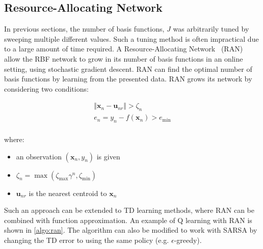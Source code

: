 \documentclass{article}
\begin{document}
\subsection{Resource-Allocating Network}

In previous sections, the number of basis functions, $J$ was arbitrarily tuned by sweeping multiple different values. Such a tuning method is often impractical due to a large amount of time required. A Resource-Allocating Network~\cite{plattResourceallocatingNetworkFunction1991} (RAN) allow the RBF network to grow in its number of basis functions in an online setting, using stochastic gradient descent. RAN can find the optimal number of basis functions by learning from the presented data. RAN grows its network by considering two conditions:

\begin{equation}
    \begin{split}
        \Vert \pmb{x}_n - \pmb{u}_{nr} \Vert > \zeta_n\\
        e_n = y_n - f(\pmb{x}_n) > e_{\min}\\
    \end{split}
\end{equation}

where:
\begin{itemize}
    \item an observation $(\pmb{x}_n, y_n)$ is given
    \item $\zeta_n = \max(\zeta_{\max} \gamma^n, \zeta_{\min})$
    \item $\pmb{u}_{nr}$ is the nearest centroid to $\pmb{x}_n$
\end{itemize}


Such an approach can be extended to TD learning methods, where RAN can be combined with function approximation. An example of Q learning with RAN is shown in \cref{algo:ran}. The algorithm can also be modified to work with SARSA by changing the TD error to using the same policy (e.g. $\epsilon$-greedy).
\end{document}
